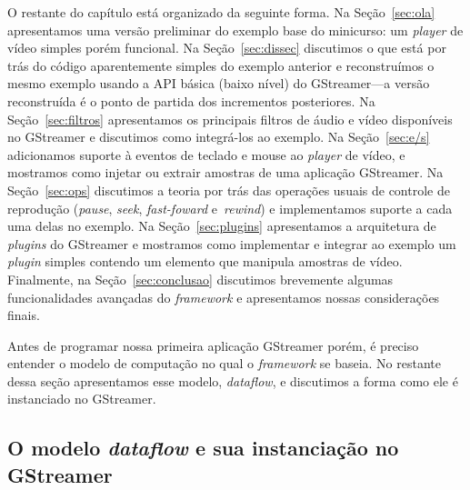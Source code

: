\documentclass{SBCbookchapter}
\def\en#1{\foreignlanguage{english}{\emph{#1}}}
\begin{document}
O restante do capítulo está organizado da seguinte forma.  Na
Seção~\ref{sec:ola} apresentamos uma versão preliminar do exemplo base do
minicurso: um \en{player} de vídeo simples porém funcional.  Na
Seção~\ref{sec:dissec} discutimos o que está por trás do código
aparentemente simples do exemplo anterior e reconstruímos o mesmo exemplo
usando a API básica (baixo nível) do GStreamer---a versão reconstruída é o
ponto de partida dos incrementos posteriores.  Na Seção~\ref{sec:filtros}
apresentamos os principais filtros de áudio e vídeo disponíveis no GStreamer
e discutimos como integrá-los ao exemplo.  Na Seção~\ref{sec:e/s}
adicionamos suporte à eventos de teclado e mouse ao \en{player} de vídeo, e
mostramos como injetar ou extrair amostras de uma aplicação GStreamer.  Na
Seção~\ref{sec:ops} discutimos a teoria por trás das operações usuais de
controle de reprodução (\en{pause}, \en{seek}, \en{fast-foward}
e~\en{rewind}) e implementamos suporte a cada uma delas no exemplo.  Na
Seção~\ref{sec:plugins} apresentamos a arquitetura de \en{plugins} do
GStreamer e mostramos como implementar e integrar ao exemplo um
\emph{plugin} simples contendo um elemento que manipula amostras de vídeo.
Finalmente, na Seção~\ref{sec:conclusao} discutimos brevemente algumas
funcionalidades avançadas do \en{framework} e apresentamos nossas
considerações finais.

Antes de programar nossa primeira aplicação GStreamer porém, é preciso
entender o modelo de computação no qual o \en{framework} se baseia.  No
restante dessa seção apresentamos esse modelo, \emph{dataflow}, e discutimos
a forma como ele é instanciado no GStreamer.


\subsection*{O modelo \en{dataflow} e sua instanciação no GStreamer}
\end{document}
